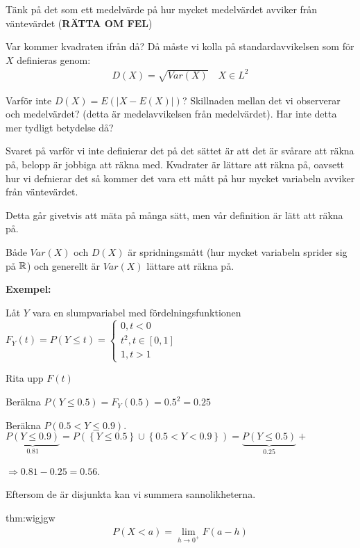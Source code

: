 \par\bigskip
\noindent Tänk på det som ett medelvärde på hur mycket medelvärdet avviker från väntevärdet (\textbf{RÄTTA OM FEL})
\par\bigskip
\noindent Var kommer kvadraten ifrån då? Då måste vi kolla på standardavvikelsen som för $X$ definieras genom:
\begin{equation*}
  \begin{gathered}
    D(X) = \sqrt{Var(X)}\quad X\in L^2
  \end{gathered}
\end{equation*}
\par\bigskip
\noindent Varför inte $D(X) = E(\left|X-E(X)\right|)$? Skillnaden mellan det vi observerar och medelvärdet? (detta är medelavvikelsen från medelvärdet). Har inte detta mer tydligt betydelse då?
\par\bigskip
\noindent Svaret på varför vi inte definierar det på det sättet är att det är svårare att räkna på, belopp är jobbiga att räkna med. Kvadrater är lättare att räkna på, oavsett hur vi defnierar det så kommer det vara ett mått på hur mycket variabeln avviker från väntevärdet.
\par\bigskip
\noindent Detta går givetvis att mäta på många sätt, men vår definition är lätt att räkna på.
\par\bigskip
\noindent Både $Var(X)$ och $D(X)$ är spridningsmått (hur mycket variabeln sprider sig på $\mathbb{R}$) och generellt är $Var(X)$ lättare att räkna på.
\par\bigskip
\noindent\textbf{Exempel:}\par
\noindent Låt $Y$ vara en slumpvariabel med fördelningsfunktionen $F_Y(t)=P(Y\leq t) = \begin{cases}0,t<0\\t^2, t\in[0,1]\\1, t>1\end{cases}$
\par\bigskip
\noindent Rita upp $F(t)$\par
\noindent Beräkna $P(Y\leq 0.5) = F_Y(0.5) = 0.5^2=0.25$\par
\noindent Beräkna $P(0.5<Y\leq 0.9)$. $\underbrace{P(Y\leq 0.9)}_{\text{0.81}} = P(\left\{Y\leq 0.5\right\}\cup\left\{0.5<Y<0.9\right\}) = \underbrace{P(Y\leq0.5)}_{\text{0.25}}+$\par\noindent$\Rightarrow 0.81-0.25=0.56$.\par
\noindent Eftersom de är disjunkta kan vi summera sannolikheterna.
\par\bigskip
\begin{theo}{thm:wigjgw}
  \begin{equation*}
    \begin{gathered}
      P(X<a)=\lim_{h\to0^+}F(a-h)
    \end{gathered}
  \end{equation*}
\end{theo}
